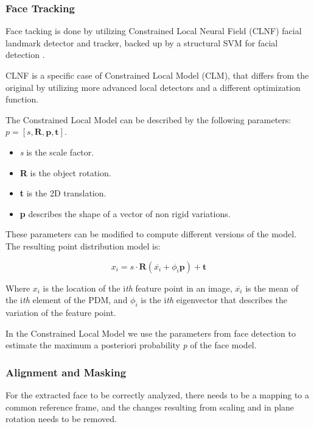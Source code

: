 \subsubsection{Face Tracking}
Face tacking is done by utilizing Constrained Local Neural Field (CLNF) facial landmark detector and tracker, backed up by a structural SVM for facial detection \cite{Baltru2013}.

CLNF is a specific case of Constrained Local Model (CLM), that differs from the original by utilizing more advanced local detectors and a different optimization function.

The Constrained Local Model can be described by the following parameters: \\
$p = [s, \mathbf{R}, \mathbf{p}, \mathbf{t}]$.
\begin{itemize}[noitemsep, topsep = -5pt]
	\item \textit{s} is the scale factor.
	\item \textbf{R} is the object rotation.
	\item \textbf{t} is the 2D translation.
	\item \textbf{p} describes the shape of a vector of non rigid variations.
\end{itemize}

These parameters can be modified to compute different versions of the model. The resulting point distribution model is:

\begin{equation} \label{eq:pdm}
	x_i = s \cdot \mathbf{R}(\overline{x_i} + \phi_i \mathbf{p}) + \mathbf{t}
\end{equation}

Where $x_i$ is the location of the i\textit{th} feature point in an image, $\overline{x_i}$ is the mean of the i\textit{th} element of the PDM, and $\phi_i$ is the i\textit{th} eigenvector that describes the variation of the feature point.

In the Constrained Local Model we use the parameters from face detection to estimate the maximum a posteriori probability \textit{p} of the face model.

\subsubsection{Alignment and Masking}
For the extracted face to be correctly analyzed, there needs to be a mapping to a common reference frame, and the changes resulting from scaling and in plane rotation needs to be removed. 


